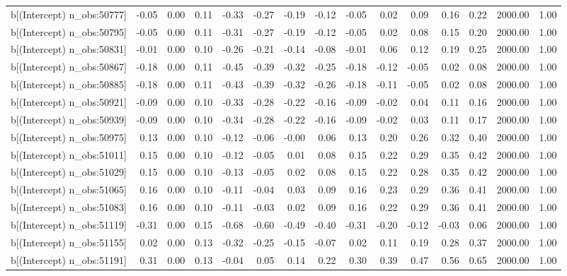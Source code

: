 \begin{table}[ht]
\begin{tabular}{rrrrrrrrrrrrrrr}
  b[(Intercept) n\_obs:50777] & -0.05 & 0.00 & 0.11 & -0.33 & -0.27 & -0.19 & -0.12 & -0.05 & 0.02 & 0.09 & 0.16 & 0.22 & 2000.00 & 1.00 \\ 
  b[(Intercept) n\_obs:50795] & -0.05 & 0.00 & 0.11 & -0.31 & -0.27 & -0.19 & -0.12 & -0.05 & 0.02 & 0.08 & 0.15 & 0.20 & 2000.00 & 1.00 \\ 
  b[(Intercept) n\_obs:50831] & -0.01 & 0.00 & 0.10 & -0.26 & -0.21 & -0.14 & -0.08 & -0.01 & 0.06 & 0.12 & 0.19 & 0.25 & 2000.00 & 1.00 \\ 
  b[(Intercept) n\_obs:50867] & -0.18 & 0.00 & 0.11 & -0.45 & -0.39 & -0.32 & -0.25 & -0.18 & -0.12 & -0.05 & 0.02 & 0.08 & 2000.00 & 1.00 \\ 
  b[(Intercept) n\_obs:50885] & -0.18 & 0.00 & 0.11 & -0.43 & -0.39 & -0.32 & -0.26 & -0.18 & -0.11 & -0.05 & 0.02 & 0.08 & 2000.00 & 1.00 \\ 
  b[(Intercept) n\_obs:50921] & -0.09 & 0.00 & 0.10 & -0.33 & -0.28 & -0.22 & -0.16 & -0.09 & -0.02 & 0.04 & 0.11 & 0.16 & 2000.00 & 1.00 \\ 
  b[(Intercept) n\_obs:50939] & -0.09 & 0.00 & 0.10 & -0.34 & -0.28 & -0.22 & -0.16 & -0.09 & -0.02 & 0.03 & 0.11 & 0.17 & 2000.00 & 1.00 \\ 
  b[(Intercept) n\_obs:50975] & 0.13 & 0.00 & 0.10 & -0.12 & -0.06 & -0.00 & 0.06 & 0.13 & 0.20 & 0.26 & 0.32 & 0.40 & 2000.00 & 1.00 \\ 
  b[(Intercept) n\_obs:51011] & 0.15 & 0.00 & 0.10 & -0.12 & -0.05 & 0.01 & 0.08 & 0.15 & 0.22 & 0.29 & 0.35 & 0.42 & 2000.00 & 1.00 \\ 
  b[(Intercept) n\_obs:51029] & 0.15 & 0.00 & 0.10 & -0.13 & -0.05 & 0.02 & 0.08 & 0.15 & 0.22 & 0.28 & 0.35 & 0.42 & 2000.00 & 1.00 \\ 
  b[(Intercept) n\_obs:51065] & 0.16 & 0.00 & 0.10 & -0.11 & -0.04 & 0.03 & 0.09 & 0.16 & 0.23 & 0.29 & 0.36 & 0.41 & 2000.00 & 1.00 \\ 
  b[(Intercept) n\_obs:51083] & 0.16 & 0.00 & 0.10 & -0.11 & -0.03 & 0.02 & 0.09 & 0.16 & 0.22 & 0.29 & 0.36 & 0.41 & 2000.00 & 1.00 \\ 
  b[(Intercept) n\_obs:51119] & -0.31 & 0.00 & 0.15 & -0.68 & -0.60 & -0.49 & -0.40 & -0.31 & -0.20 & -0.12 & -0.03 & 0.06 & 2000.00 & 1.00 \\ 
  b[(Intercept) n\_obs:51155] & 0.02 & 0.00 & 0.13 & -0.32 & -0.25 & -0.15 & -0.07 & 0.02 & 0.11 & 0.19 & 0.28 & 0.37 & 2000.00 & 1.00 \\ 
  b[(Intercept) n\_obs:51191] & 0.31 & 0.00 & 0.13 & -0.04 & 0.05 & 0.14 & 0.22 & 0.30 & 0.39 & 0.47 & 0.56 & 0.65 & 2000.00 & 1.00 \\ 

\end{tabular}
\end{table}
